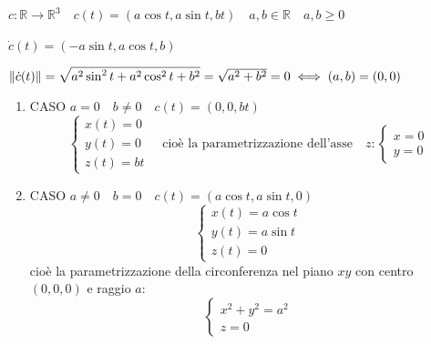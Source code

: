         \begin{esempio}
        $c: \mathbb{R} \to \mathbb{R}^3 \quad c(t)=(a \cos t, a \sin t, bt) \quad a,b \in \mathbb{R} \quad a,b \geq 0$ 
        
        $\dot{c}(t) = (-a \sin t, a \cos t, b)$ 

        $\lVert\dot{c}(t)\rVert = \sqrt{a^2 \sin^2 t + a^2 \cos^2 t + b^2} = \sqrt{a^2 + b^2} = 0 \iff (a,b) = (0,0)$
        \begin{enumerate}
            \item[I] CASO $a=0 \quad b \neq 0 \quad c(t) = (0,0,bt)$ 
            \[ \begin{cases*}
                x(t) = 0 \\
                y(t) = 0 \\
                z(t) = bt
            \end{cases*} \quad \text{cioè la parametrizzazione dell'asse} \quad z:\begin{cases*}
                x = 0 \\
                y = 0 
            \end{cases*} \]
            

            \item[II] CASO $a \neq 0 \quad b = 0 \quad c(t) = (a \cos t, a \sin t, 0)$
            \[ \begin{cases*}
                x(t) = a \cos t \\
                y(t) = a \sin t \\
                z(t) = 0
            \end{cases*} \] 
            cioè la parametrizzazione della circonferenza nel piano $xy$ con centro $(0,0,0)$ e raggio $a$:
            \[ \begin{cases*}
                x^2 + y^2 = a^2 \\
                z = 0
            \end{cases*} \]
            \begin{center}
\end{center}
\end{enumerate}
\end{esempio}
